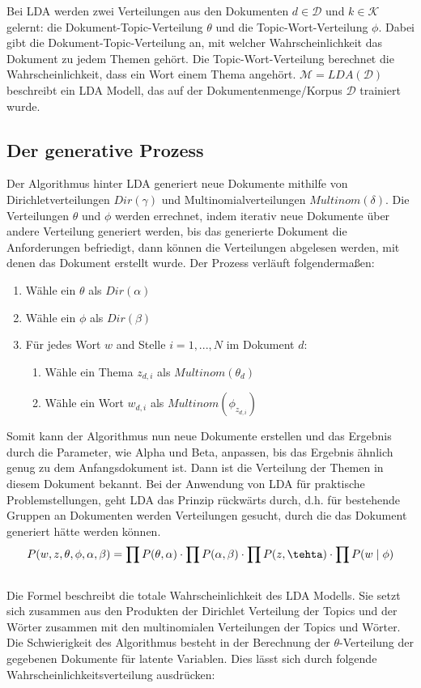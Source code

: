 \documentclass[german,version-2020-11]{uzl-thesis}
\begin{document}
Bei LDA werden zwei Verteilungen aus den Dokumenten $d \in \mathcal{D}$ und $k \in \mathcal{K}$gelernt: die Dokument-Topic-Verteilung $\theta$ und die Topic-Wort-Verteilung $\phi$. Dabei gibt die Dokument-Topic-Verteilung an, mit welcher Wahrscheinlichkeit das Dokument zu jedem Themen gehört. Die Topic-Wort-Verteilung berechnet die Wahrscheinlichkeit, dass ein Wort einem Thema angehört. $\mathcal{M} = LDA(\mathcal{D})$ beschreibt ein LDA Modell, das auf der Dokumentenmenge/Korpus $\mathcal{D}$ trainiert wurde.


\subsection{Der generative Prozess} 
Der Algorithmus hinter LDA generiert neue Dokumente mithilfe von Dirichletverteilungen $Dir(\gamma)$ und Multinomialverteilungen $Multinom(\delta)$. Die Verteilungen $\theta$ und $\phi$ werden errechnet, indem iterativ neue Dokumente über andere Verteilung generiert werden, bis das generierte Dokument die Anforderungen befriedigt, dann können die Verteilungen abgelesen werden, mit denen das Dokument erstellt wurde. Der Prozess verläuft folgendermaßen: 
\begin{enumerate}
	\item Wähle ein $\theta$ als $Dir(\alpha)$
	\item Wähle ein $\phi$ als $Dir(\beta)$
	\item Für jedes Wort $w$ and Stelle $i = 1,...,N$ im Dokument $d$: 
	\begin{enumerate}
		\item Wähle ein Thema $z_{d,i}$ als $Multinom(\theta_d)$
		\item Wähle ein Wort $w_{d,i}$ als $Multinom(\phi_z_{d,i})$
	\end{enumerate}
\end{enumerate}

Somit kann der Algorithmus nun neue Dokumente erstellen und das Ergebnis durch die Parameter, wie Alpha und Beta, anpassen, bis das Ergebnis ähnlich genug zu dem Anfangsdokument ist. Dann ist die Verteilung der Themen in diesem Dokument bekannt. Bei der Anwendung von LDA für praktische Problemstellungen, geht LDA das Prinzip rückwärts durch, d.h. für bestehende Gruppen an Dokumenten werden Verteilungen gesucht, durch die das Dokument generiert hätte werden können. \\

\begin{equation}
P(w,z,\theta, \phi, \alpha, \beta) = \prod P(\theta, \alpha) \cdot \prod P(\alpha, \beta) \cdot \prod P(z,\tehta) \cdot \prod P(w \mid \phi) 
\end{equation}
\\
Die Formel beschreibt die totale Wahrscheinlichkeit des LDA Modells. Sie setzt sich zusammen aus den Produkten der Dirichlet Verteilung der Topics und der Wörter zusammen mit den multinomialen Verteilungen der Topics und Wörter. Die Schwierigkeit des Algorithmus besteht in der Berechnung der $\theta$-Verteilung der gegebenen Dokumente für latente Variablen. Dies lässt sich durch folgende Wahrscheinlichkeitsverteilung ausdrücken: 
\end{document}
